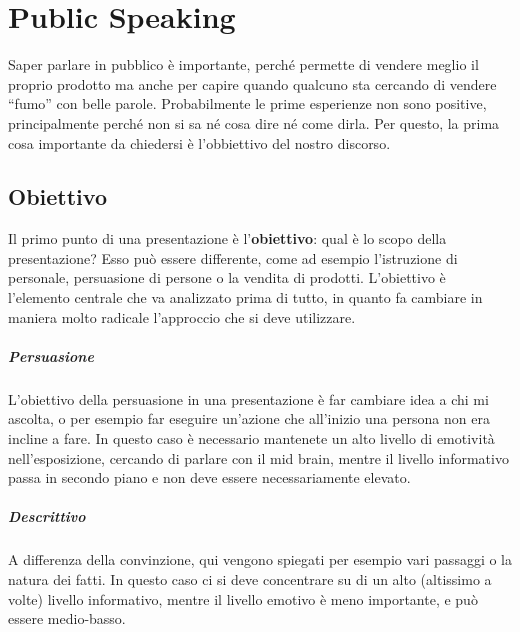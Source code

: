 
\chapter{Public Speaking}

Saper parlare in pubblico è importante, perché permette di vendere meglio il
proprio prodotto ma anche per capire quando qualcuno sta cercando di vendere
``fumo'' con belle parole. Probabilmente le prime esperienze non sono positive,
principalmente perché non si sa né cosa dire né come dirla. Per questo, la
prima cosa importante da chiedersi è l'obbiettivo del nostro discorso.

\section{Obiettivo}

Il primo punto di una presentazione è l'\textbf{obiettivo}: qual è lo scopo
della presentazione? Esso può essere differente, come ad esempio l'istruzione
di personale, persuasione di persone o la vendita di prodotti. L'obiettivo è
l'elemento centrale che va analizzato prima di tutto, in quanto fa
cambiare in maniera molto radicale l'approccio che si deve utilizzare.

\paragraph*{Persuasione} L'obiettivo della persuasione in una presentazione è
far cambiare idea a chi mi ascolta, o per esempio far eseguire un'azione che
all'inizio una persona non era incline a fare. In questo caso è necessario
mantenete un alto livello di emotività nell'esposizione, cercando di parlare
con il mid brain, mentre il livello informativo passa in secondo piano e non
deve essere necessariamente elevato.

\paragraph*{Descrittivo} A differenza della convinzione, qui vengono spiegati
per esempio vari passaggi o la natura dei fatti. In questo caso ci si deve
concentrare su di un alto (altissimo a volte) livello informativo, mentre il
livello emotivo è meno importante, e può essere medio-basso.

